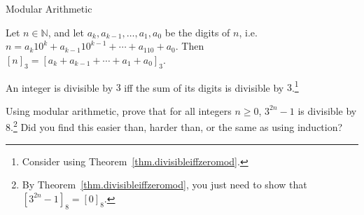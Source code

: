 \begin{section}{Modular Arithmetic}
\begin{theorem}
Let $n\in \mathbb{N}$, and let $a_k, a_{k-1}, \ldots, a_1, a_0$ be the digits of $n$, i.e. $n=a_k10^k + a_{k-1}10^{k-1} + \cdots + a_110 + a_0$. Then $[n]_3 =  [a_k + a_{k-1} + \cdots + a_1 + a_0]_3$.
\end{theorem}

\begin{theorem}
An integer is divisible by $3$ iff the sum of its digits is divisible by $3$.\footnote{Consider using Theorem~\ref{thm.divisibleiffzeromod}.}
\end{theorem}

\begin{exercise}
Using modular arithmetic, prove that for all integers $n \ge 0$, $3^{2n}-1$ is divisible by $8$.\footnote{By Theorem~\ref{thm.divisibleiffzeromod}, you just need to show that $[3^{2n}-1]_8 = [0]_8$.} Did you find this easier than, harder than, or the same as using induction?
\end{exercise}

\end{section}
